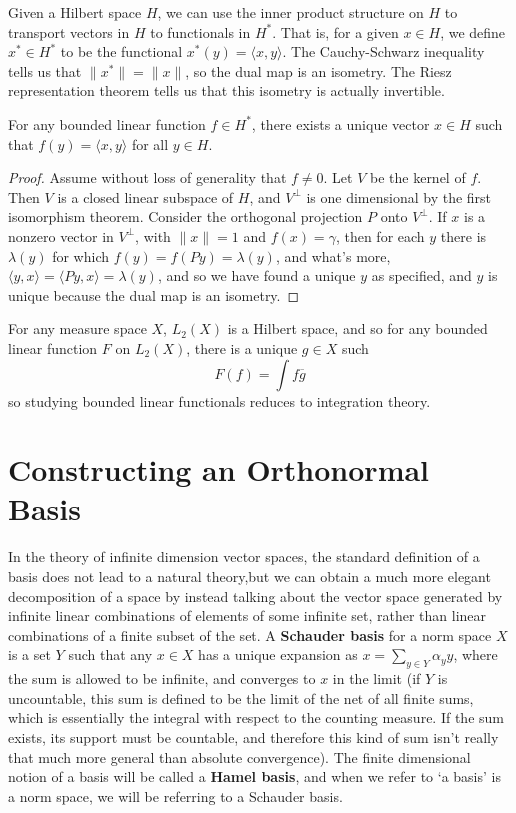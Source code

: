 Given a Hilbert space $H$, we can use the inner product structure on $H$ to transport vectors in $H$ to functionals in $H^*$. That is, for a given $x \in H$, we define $x^* \in H^*$ to be the functional $x^*(y) = \langle x, y \rangle$. The Cauchy-Schwarz inequality tells us that $\| x^* \| = \| x \|$, so the dual map is an isometry. The Riesz representation theorem tells us that this isometry is actually invertible.

\begin{theorem}[Riesz]
    For any bounded linear function $f \in H^*$, there exists a unique vector $x \in H$ such that $f(y) = \langle x, y \rangle$ for all $y \in H$.
\end{theorem}
\begin{proof}
    Assume without loss of generality that $f \neq 0$. Let $V$ be the kernel of $f$. Then $V$ is a closed linear subspace of $H$, and $V^\perp$ is one dimensional by the first isomorphism theorem. Consider the orthogonal projection $P$ onto $V^\perp$. If $x$ is a nonzero vector in $V^\perp$, with $\| x \| = 1$ and $f(x) = \gamma$, then for each $y$ there is $\lambda(y)$ for which $f(y) = f(Py) = \lambda(y)$, and what's more, $\langle y, x \rangle = \langle Py, x \rangle = \lambda(y)$, and so we have found a unique $y$ as specified, and $y$ is unique because the dual map is an isometry.
\end{proof}

\begin{example}
    For any measure space $X$, $L_2(X)$ is a Hilbert space, and so for any bounded linear function $F$ on $L_2(X)$, there is a unique $g \in X$ such
    \[ F(f) = \int f \overline{g} \]
    so studying bounded linear functionals reduces to integration theory.
\end{example}

\section{Constructing an Orthonormal Basis}

In the theory of infinite dimension vector spaces, the standard definition of a basis does not lead to a natural theory,but we can obtain a much more elegant decomposition of a space by instead talking about the vector space generated by infinite linear combinations of elements of some infinite set, rather than linear combinations of a finite subset of the set. A {\bf Schauder basis} for a norm space $X$ is a set $Y$ such that any $x \in X$ has a unique expansion as $x = \sum_{y \in Y} \alpha_y y$, where the sum is allowed to be infinite, and converges to $x$ in the limit (if $Y$ is uncountable, this sum is defined to be the limit of the net of all finite sums, which is essentially the integral with respect to the counting measure. If the sum exists, its support must be countable, and therefore this kind of sum isn't really that much more general than absolute convergence). The finite dimensional notion of a basis will be called a {\bf Hamel basis}, and when we refer to `a basis' is a norm space, we will be referring to a Schauder basis.

